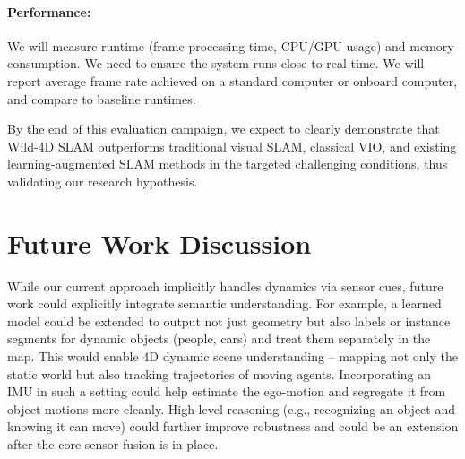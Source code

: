 \paragraph{Performance:} We will measure runtime (frame processing time, CPU/GPU usage) and memory consumption. We need to ensure the system runs close to real-time. We will report average frame rate achieved on a standard computer or onboard computer, and compare to baseline runtimes. 




By the end of this evaluation campaign, we expect to clearly demonstrate that Wild-4D SLAM outperforms traditional visual SLAM, classical VIO, and existing learning-augmented SLAM methods in the targeted challenging conditions, thus validating our research hypothesis.















\section{Future Work Discussion}
  While our current approach implicitly handles dynamics via sensor cues, future work could explicitly integrate semantic understanding. For example, a learned model could be extended to output not just geometry but also labels or instance segments for dynamic objects (people, cars) and treat them separately in the map. This would enable 4D dynamic scene understanding – mapping not only the static world but also tracking trajectories of moving agents. Incorporating an IMU in such a setting could help estimate the ego-motion and segregate it from object motions more cleanly. High-level reasoning (e.g., recognizing an object and knowing it can move) could further improve robustness and could be an extension after the core sensor fusion is in place.





